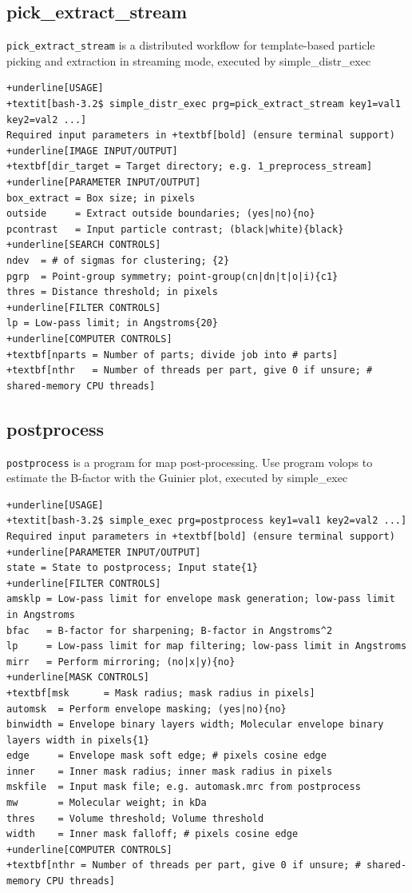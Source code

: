 \documentclass[a4paper,11pt]{article}
\newcommand{\prgname}[1]{\textcolor{NavyBlue}{\texttt{#1}}}
\begin{document}
\subsection{pick\_extract\_stream}
\label{pick_extract_stream}
\prgname{pick\_extract\_stream} is a distributed workflow for template-based particle picking and extraction in streaming mode, executed by simple\_distr\_exec
\begin{Verbatim}[commandchars=+\[\],fontsize=\small,breaklines=true]
+underline[USAGE]
+textit[bash-3.2$ simple_distr_exec prg=pick_extract_stream key1=val1 key2=val2 ...]
Required input parameters in +textbf[bold] (ensure terminal support)
+underline[IMAGE INPUT/OUTPUT]
+textbf[dir_target = Target directory; e.g. 1_preprocess_stream]
+underline[PARAMETER INPUT/OUTPUT]
box_extract = Box size; in pixels
outside     = Extract outside boundaries; (yes|no){no}
pcontrast   = Input particle contrast; (black|white){black}
+underline[SEARCH CONTROLS]
ndev  = # of sigmas for clustering; {2}
pgrp  = Point-group symmetry; point-group(cn|dn|t|o|i){c1}
thres = Distance threshold; in pixels
+underline[FILTER CONTROLS]
lp = Low-pass limit; in Angstroms{20}
+underline[COMPUTER CONTROLS]
+textbf[nparts = Number of parts; divide job into # parts]
+textbf[nthr   = Number of threads per part, give 0 if unsure; # shared-memory CPU threads]
\end{Verbatim}

\subsection{postprocess}
\label{postprocess}
\prgname{postprocess} is a program for map post-processing. Use program volops to estimate the B-factor with the Guinier plot, executed by simple\_exec
\begin{Verbatim}[commandchars=+\[\],fontsize=\small,breaklines=true]
+underline[USAGE]
+textit[bash-3.2$ simple_exec prg=postprocess key1=val1 key2=val2 ...]
Required input parameters in +textbf[bold] (ensure terminal support)
+underline[PARAMETER INPUT/OUTPUT]
state = State to postprocess; Input state{1}
+underline[FILTER CONTROLS]
amsklp = Low-pass limit for envelope mask generation; low-pass limit in Angstroms
bfac   = B-factor for sharpening; B-factor in Angstroms^2
lp     = Low-pass limit for map filtering; low-pass limit in Angstroms
mirr   = Perform mirroring; (no|x|y){no}
+underline[MASK CONTROLS]
+textbf[msk      = Mask radius; mask radius in pixels]
automsk  = Perform envelope masking; (yes|no){no}
binwidth = Envelope binary layers width; Molecular envelope binary layers width in pixels{1}
edge     = Envelope mask soft edge; # pixels cosine edge
inner    = Inner mask radius; inner mask radius in pixels
mskfile  = Input mask file; e.g. automask.mrc from postprocess
mw       = Molecular weight; in kDa
thres    = Volume threshold; Volume threshold
width    = Inner mask falloff; # pixels cosine edge
+underline[COMPUTER CONTROLS]
+textbf[nthr = Number of threads per part, give 0 if unsure; # shared-memory CPU threads]
\end{Verbatim}
\end{document}
